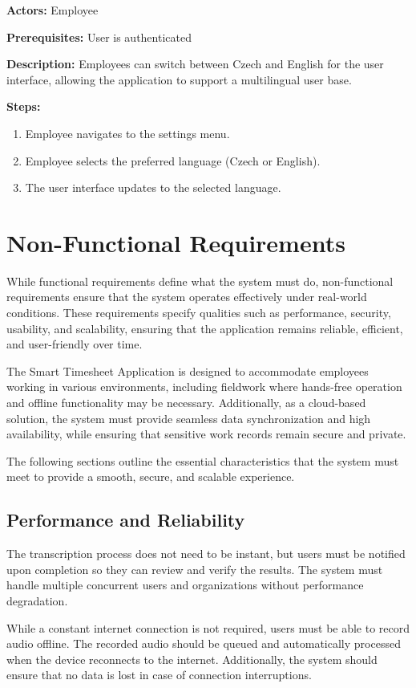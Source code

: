 \documentclass[
  digital,     %
  oneside,     %
  nosansbold,  %
  nocolorbold, %
  lof,         %
  lot,         %
]{fithesis4}
\begin{document}
\noindent \textbf{Actors:} Employee

\noindent \textbf{Prerequisites:} User is authenticated

\noindent \textbf{Description:}  
Employees can switch between Czech and English for the user interface, allowing the application to support a multilingual user base.

\noindent \textbf{Steps:}
\begin{enumerate}
    \item Employee navigates to the settings menu.
    \item Employee selects the preferred language (Czech or English).
    \item The user interface updates to the selected language.
\end{enumerate}

\section{Non-Functional Requirements}

While functional requirements define what the system must do, non-functional requirements ensure that the system operates effectively under real-world conditions. These requirements specify qualities such as performance, security, usability, and scalability, ensuring that the application remains reliable, efficient, and user-friendly over time.  

The Smart Timesheet Application is designed to accommodate employees working in various environments, including fieldwork where hands-free operation and offline functionality may be necessary. Additionally, as a cloud-based solution, the system must provide seamless data synchronization and high availability, while ensuring that sensitive work records remain secure and private.  

The following sections outline the essential characteristics that the system must meet to provide a smooth, secure, and scalable experience.

\subsection{Performance and Reliability}  
The transcription process does not need to be instant, but users must be notified upon completion so they can review and verify the results. The system must handle multiple concurrent users and organizations without performance degradation.  

While a constant internet connection is not required, users must be able to record audio offline. The recorded audio should be queued and automatically processed when the device reconnects to the internet. Additionally, the system should ensure that no data is lost in case of connection interruptions.
\end{document}
